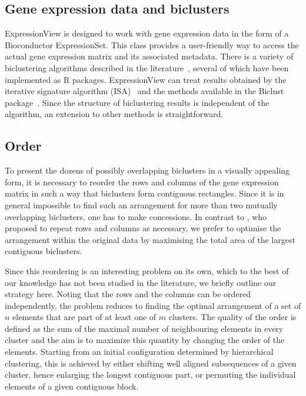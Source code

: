 \documentclass[round]{bioinfo}
\begin{document}
\subsection{Gene expression data and biclusters}
ExpressionView is designed to work with gene expression data in the
form of a Bioconductor ExpressionSet. This class provides a
user-friendly way to access the actual gene expression matrix and its
associated metadata. There is a variety of biclustering algorithms
described in the literature~\citep{madeira04,prelic06}, several of
which have been implemented as R packages. ExpressionView can treat
results obtained by the iterative signature algorithm
(ISA)~\citep{bergmann03} %
and the methods available in the Biclust
package~\citep{kaiser08}. Since the structure of biclustering results
is independent of the algorithm, an extension to other methods is
straightforward. 

\subsection{Order}
To present the dozens of possibly overlapping biclusters in a visually
appealing form, it is necessary to reorder the rows and columns of the
gene expression matrix in such a way that biclusters form contiguous
rectangles. Since it is in general impossible to find such an
arrangement for more than two mutually overlapping biclusters, one has
to make concessions. In contrast to \cite{grothaus06}, who proposed to
repeat rows and columns as necessary, we prefer
to optimise the arrangement within the original data by maximising the
total area of the largest contiguous biclusters.  

Since this reordering is an interesting problem on its own, which to
the best of our knowledge has not been studied in the literature, we
briefly outline our strategy here. Noting that the rows and the
columns can be ordered independently, the problem reduces to finding
the optimal arrangement of a set of $n$ elements that are part of at
least one of $m$ clusters. The quality of the order is defined as the
sum of the maximal number of neighbouring elements in every cluster
and the aim is to maximize this quantity by changing the order of the
elements. Starting from an initial configuration determined by
hierarchical clustering, this is achieved by either shifting well
aligned subsequences of a given cluster, hence enlarging the longest
contiguous part, or permuting the individual elements of a given
contiguous block. 
\end{document}
